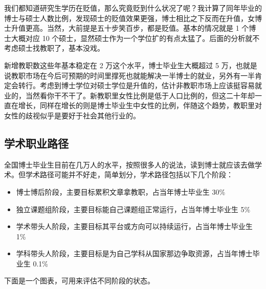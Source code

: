 \documentclass[]{tufte-book}
\begin{document}
我们都知道研究生学历在贬值，那么究竟贬到什么状况了呢？我计算了同年毕业的博士与硕士人数比例，发现硕士的贬值效果更强，博士相比之下反而在升值，女博士升值更高。当然，大前提是五十步笑百步，都是贬值。基本的情况就是 1 个博士大概对应 10 个硕士，显然硕士作为一个学位扩的有点太猛了。后面的分析就不考虑硕士找教职了，基本没戏。

新增教职数这些年基本稳定在 2 万这个水平，博士毕业生大概超过 5 万，也就是说教职市场在今后可预期的时间里撑死也就能解决一半博士的就业，另外有一半肯定会转行。考虑到博士学位对硕士学位是升值的，估计非教职市场上应该挺容易就业的，当然看你干不干了。新教职里女性比例是低于人口比例的，但这二十年却一直在增长，同样在增长的则是博士毕业生中女性的比例，伴随这个趋势，教职里对女性的歧视似乎是要好于社会其他行业的。

\hypertarget{ux5b66ux672fux804cux4e1aux8defux5f84}{%
\subsection{学术职业路径}\label{ux5b66ux672fux804cux4e1aux8defux5f84}}

全国博士毕业生目前在几万人的水平，按照很多人的说法，读到博士就应该去做学术。但学术路径可能并不好走，简单划分，学术路径包括以下几个阶段：

\begin{itemize}
\item
  博士博后阶段，主要目标累积文章拿教职，占当年博士毕业生 30\%
\item
  独立课题组阶段，主要目标能自己课题组正常运行，占当年博士毕业生 5\%
\item
  学术带头人阶段，主要目标其平台或方向可以持续运行，占当年博士毕业生 1\%
\item
  学科带头人阶段，主要目标是为自己学科从国家那边争取资源，占当年博士毕业生 0.1\%
\end{itemize}

下面是一个图表，可用来评估不同阶段的状态。
\end{document}
